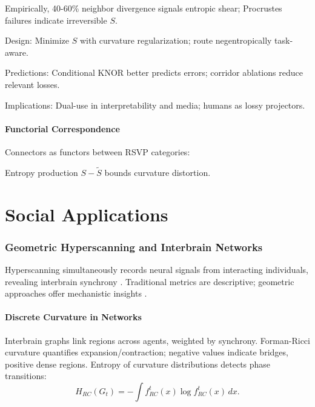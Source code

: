 \documentclass{article}
\theoremstyle{definition}
\begin{document}
Empirically, 40-60\% neighbor divergence signals entropic shear; Procrustes failures indicate irreversible $S$.

Design: Minimize $S$ with curvature regularization; route negentropically task-aware.

Predictions: Conditional KNOR better predicts errors; corridor ablations reduce relevant losses.

Implications: Dual-use in interpretability and media; humans as lossy projectors.

\subsection{Functorial Correspondence}

Connectors as functors between RSVP categories:


Entropy production $S - \tilde{S}$ bounds curvature distortion.

\part{Social Applications}

\section{Geometric Hyperscanning and Interbrain Networks}

Hyperscanning simultaneously records neural signals from interacting individuals, revealing interbrain synchrony \citep{montague2002hyperscanning}. Traditional metrics are descriptive; geometric approaches offer mechanistic insights \citep{hinrichs2025geometry}.

\subsection{Discrete Curvature in Networks}

Interbrain graphs link regions across agents, weighted by synchrony. Forman-Ricci curvature quantifies expansion/contraction; negative values indicate bridges, positive dense regions. Entropy of curvature distributions detects phase transitions:
\[
H_{RC}(G_t) = -\int f^t_{RC}(x) \log f^t_{RC}(x) \, dx.
\]
\end{document}
